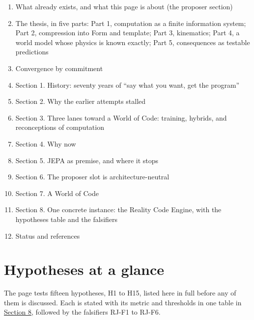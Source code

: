 \documentclass[10pt,letterpaper]{article}
\providecommand{\tightlist}{\setlength{\itemsep}{1pt}\setlength{\parskip}{0pt}}
\begin{document}
\begin{enumerate}
\def\labelenumi{\arabic{enumi}.}
\tightlist
\item
  What already exists, and what this page is about (the proposer
  section)
\item
  The thesis, in five parts: Part 1, computation as a finite information
  system; Part 2, compression into Form and template; Part 3,
  kinematics; Part 4, a world model whose physics is known exactly; Part
  5, consequences as testable predictions
\item
  Convergence by commitment
\item
  Section 1. History: seventy years of ``say what you want, get the
  program''
\item
  Section 2. Why the earlier attempts stalled
\item
  Section 3. Three lanes toward a World of Code: training, hybrids, and
  reconceptions of computation
\item
  Section 4. Why now
\item
  Section 5. JEPA as premise, and where it stops
\item
  Section 6. The proposer slot is architecture-neutral
\item
  Section 7. A World of Code
\item
  Section 8. One concrete instance: the Reality Code Engine, with the
  hypotheses table and the falsifiers
\item
  Status and references
\end{enumerate}

\section{Hypotheses at a glance}\label{hypotheses-at-a-glance}

The page tests fifteen hypotheses, H1 to H15, listed here in full before
any of them is discussed. Each is stated with its metric and thresholds
in one table in
\href{https://research.openie.dev/papers/rce-jepa/\#hypotheses}{Section
8}, followed by the falsifiers RJ-F1 to RJ-F6.
\end{document}
